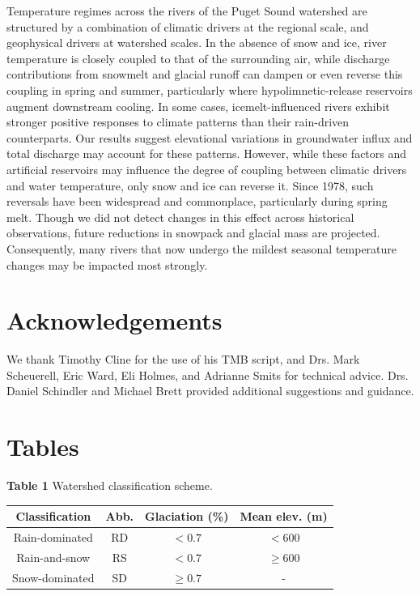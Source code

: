\documentclass[notitlepage]{article}
\begin{document}
Temperature regimes across the rivers of the Puget Sound watershed are structured by a combination of climatic drivers at the regional scale, and geophysical drivers at watershed scales. In the absence of snow and ice, river temperature is closely coupled to that of the surrounding air, while discharge contributions from snowmelt and glacial runoff can dampen or even reverse this coupling in spring and summer, particularly where hypolimnetic-release reservoirs augment downstream cooling. In some cases, icemelt-influenced rivers exhibit stronger positive responses to climate patterns than their rain-driven counterparts. Our results suggest elevational variations in groundwater influx and total discharge may account for these patterns. However, while these factors and artificial reservoirs may influence the degree of coupling between climatic drivers and water temperature, only snow and ice can reverse it. Since 1978, such reversals have been widespread and commonplace, particularly during spring melt. Though we did not detect changes in this effect across historical observations, future reductions in snowpack and glacial mass are projected. Consequently, many rivers that now undergo the mildest seasonal temperature changes may be impacted most strongly.
\clearpage

\section*{Acknowledgements}
We thank Timothy Cline for the use of his TMB script, and Drs. Mark Scheuerell, Eric Ward, Eli Holmes, and Adrianne Smits for technical advice. Drs. Daniel Schindler and Michael Brett provided additional suggestions and guidance.

\clearpage


\clearpage

\section*{Tables}
\begin{center}
\textbf{Table 1} Watershed classification scheme.
\end{center}
\begin{center}
\begin{tabular}{ |c|c|c|c| }
 \hline
 Classification & Abb. & Glaciation (\%) & Mean elev. (m) \\
 \hline
 Rain-dominated & RD & $< 0.7$ & $< 600$ \\
 Rain-and-snow & RS & $< 0.7$ & $\geq 600$ \\
 Snow-dominated & SD & $\geq 0.7$ & - \\
 \hline
\end{tabular}
\end{center}
\end{document}
